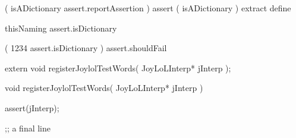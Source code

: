
\startJoylolCode
(
  isADictionary
  assert.reportAssertion
)
assert
( isADictionary ) extract
define
\stopJoylolCode

\startJoylolTest
thisNaming
assert.isDictionary
\stopJoylolTest
\stopTestCase

\startJoylolTest
(
  1234
  assert.isDictionary
) assert.shouldFail
\stopJoylolTest
\stopTestCase
\stopTestSuite

\starttyping
{}

\startJoylolCode
\stopJoylolCode

\startJoylolTest
\stopJoylolTest
\stopTestCase

\startJoylolTest
\stopJoylolTest
\stopTestCase
\stopTestSuite
\stoptyping

\startCHeader
extern void registerJoylolTestWords(
  JoyLoLInterp* jInterp
);
\stopCHeader
{}

\startCCode
void registerJoylolTestWords(
  JoyLoLInterp* jInterp
) {
  assert(jInterp);

}
\stopCCode

\startJoylolCode
;; a final line
\stopJoylolCode